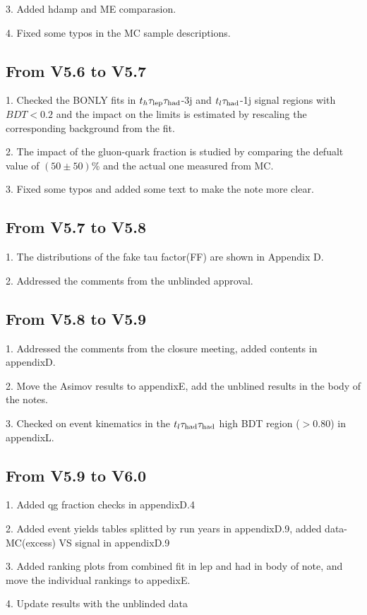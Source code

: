 3. Added hdamp and ME comparasion.

4. Fixed some typos in the MC sample descriptions.

\subsection{From V5.6 to V5.7}

1. Checked the BONLY fits in $t_h\tau_\text{lep}{}\tau_\text{had}$-3j and $t_l\tau_\text{had}$-1j signal regions with $BDT<0.2$ and the impact on the limits is estimated by
rescaling the corresponding background from the fit.

2. The impact of the gluon-quark fraction is studied by comparing the defualt value of $(50\pm50)$\% and the actual one measured from MC.

3. Fixed some typos and added some text to make the note more clear. 

\subsection{From V5.7 to V5.8}

1. The distributions of the fake tau factor(FF) are shown in Appendix D.

2. Addressed the comments from the unblinded approval. 

\subsection{From V5.8 to V5.9}

1. Addressed the comments from the closure meeting, added contents in appendixD.

2. Move the Asimov results to appendixE, add the unblined results in the body of the notes.

3. Checked on event kinematics in the $t_l\tau_\text{had}{}\tau_\text{had}$ high BDT region ($>0.80$) in appendixL.

\subsection{From V5.9 to V6.0}

1. Added qg fraction checks in appendixD.4

2. Added event yields tables splitted by run years in appendixD.9, added data-MC(excess) VS signal in appendixD.9

3. Added ranking plots from combined fit in lep and had in body of note, and move the individual rankings to appedixE.

4. Update results with the unblinded data

